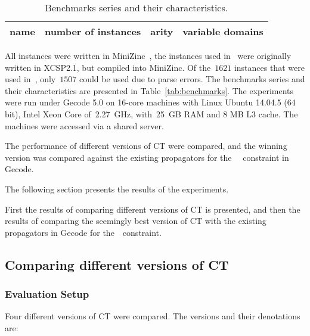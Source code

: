 \documentclass[a4paper,11pt]{article}
\newcommand{\Secref}[1]{Section~\ref{#1}}
\newcommand{\Table}{\Constraint{Table}~}
\newcommand{\CTpaper}[0]{DBLP:conf/cp/DemeulenaereHLP16}
\numberwithin{equation}{section}
\begin{document}
\begin{table}[h]\small
  \centering
  \begin{tabular}{lccc}  %
    name & number of instances & arity & variable domains \\
    \midrule
     
  \end{tabular}
  \caption{Benchmarks series and their characteristics.}
  \label{tab:benchmars}
\end{table}

All instances were written in MiniZinc~\cite{MiniZinc}, the
instances used in~\cite{\CTpaper} were originally written in XCSP2.1,
but compiled into MiniZinc. Of the~$1621$ instances that were used in~\cite{\CTpaper},
only~$1507$ could be used due to parse errors.
The benchmarks series and their characteristics are presented in Table~\ref{tab:benchmarks}.
The experiments were run
under Gecode 5.0 on 16-core machines with Linux Ubuntu 14.04.5 (64 bit),
Intel Xeon Core of~2.27~GHz, with~25~GB RAM and 8 MB L3 cache. The machines
were accessed via a shared server.

The performance of different versions of CT were compared, and the winning
version was compared against the existing propagators for
the \Table~constraint in Gecode.

The following section presents the results of the experiments.

First the results of comparing different versions of CT is presented,
and then the results of comparing the seemingly best version of CT with 
the existing propagators in Gecode for the~\Table constraint.





\subsection{Comparing different versions of CT}
\label{sec:compare}

\subsubsection{Evaluation Setup}
Four different versions of CT were compared.
The versions and their denotations are:
\end{document}
